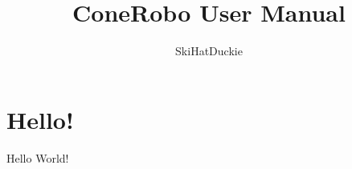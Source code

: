 \documentclass[11pt]{article}
\title{ConeRobo User Manual}
\author{SkiHatDuckie}
\begin{document}
   \maketitle
   \newpage

   \tableofcontents
   \newpage

   \section{Hello!}
   Hello World!
\end{document}
